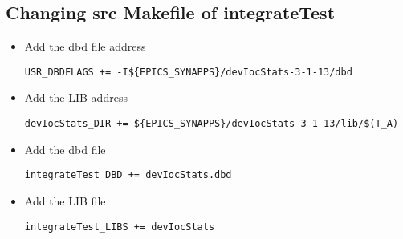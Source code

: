 \documentclass[11pt
  , a4paper
  , article
  , oneside
]{memoir}
\begin{document}
\subsection{Changing src Makefile of integrateTest}
\begin{itemize}

	\item Add the dbd file address
	\begin{lstlisting}[style=termstyle]
USR_DBDFLAGS += -I${EPICS_SYNAPPS}/devIocStats-3-1-13/dbd
\end{lstlisting}
	\item Add the LIB address
	\begin{lstlisting}[style=termstyle]
devIocStats_DIR += ${EPICS_SYNAPPS}/devIocStats-3-1-13/lib/$(T_A)
\end{lstlisting}
	\item Add the dbd file
	\begin{lstlisting}[style=termstyle]
integrateTest_DBD += devIocStats.dbd
\end{lstlisting}
	\item Add the LIB file
	\begin{lstlisting}[style=termstyle]
integrateTest_LIBS += devIocStats
\end{lstlisting}
\end{itemize}
\end{document}
